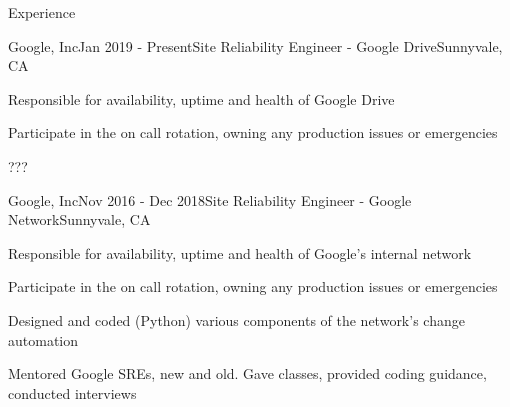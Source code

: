 \documentclass{resume}
\begin{document}
  \begin{rSection}{Experience}
    \begin{rSubsection}{Google, Inc}{Jan 2019 - Present}{Site Reliability Engineer - Google Drive}{Sunnyvale, CA}
      \item Responsible for availability, uptime and health of Google Drive
      \item Participate in the on call rotation, owning any production issues or emergencies
      \item ???
    \end{rSubsection}

    \begin{rSubsection}{Google, Inc}{Nov 2016 - Dec 2018}{Site Reliability Engineer - Google Network}{Sunnyvale, CA}
      \item Responsible for availability, uptime and health of Google's internal network
      \item Participate in the on call rotation, owning any production issues or emergencies
      \item Designed and coded (Python) various components of the network's change automation
      \item Mentored Google SREs, new and old. Gave classes, provided coding guidance, conducted interviews
    \end{rSubsection}

    \begin{comment}
      \begin{rSubsection}{Machine Zone, Inc}{Jul 2016 - Oct 2016}{Senior Site Reliability Engineer}{Palo Alto, CA}
        \item Team lead, responsible for creating and enforcing SRE policies
        \item On call, responding to pages and maintaining production reliability of all of MZ's production systems
        \item Identify pain points and take lead in engineering solutions, removing the pain
        \item Define problems, organizing and assisting others to allow them to create solutions
        \item Change procedures and process based on what isn't working well and working with others to improve the status quo
        \item Work with Puppet, Foreman, Salt, Nginx, ELK and many more technologies
      \end{rSubsection}
    \end{comment}


\end{rSection}
\end{document}
